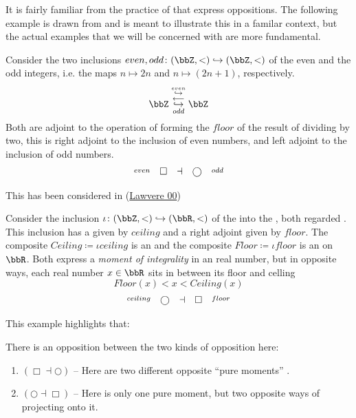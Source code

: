 It is fairly familiar from the practice of  that  express oppositions. The following example is drawn from  and is meant to illustrate this in a familar context, but the actual examples that we will be concerned with are more fundamental.
\begin{example}
\label{}\hypertarget{}{}
Consider the two inclusions $even, odd \colon (\bbZ,\lt ) \hookrightarrow (\bbZ,\lt)$ of the even and the odd integers, i.e. the maps $n \mapsto 2 n$ and $n \mapsto (2n+1)$, respectively.
\begin{displaymath}
\bbZ
\stackrel{\overset{even}{\hookrightarrow}}{\stackrel{\longleftarrow}{\underset{odd}{\hookrightarrow}}}
\bbZ
\end{displaymath}
Both are adjoint to the operation of forming the $floor$ of the result of dividing by two, this is right adjoint to the inclusion of even numbers, and left adjoint to the inclusion of odd numbers.
\begin{displaymath}
\begin{matrix}
\stackrel{even}{} & \Box &\dashv& \bigcirc & \stackrel{odd}{}
\end{matrix}
\end{displaymath}
\end{example}
This has been considered in (\href{http://ncatlab.org/nlab/show/Aufhebung#Law00}{Lawvere 00})
\begin{example}
\label{}\hypertarget{}{}
Consider the inclusion $\iota \colon (\bbZ, \lt) \hookrightarrow (\bbR, \lt)$ of the  into the , both regarded . This inclusion has a  given by $ceiling$ and a right adjoint given by $floor$. The composite $Ceiling \coloneqq \iota ceiling$ is an  and the composite $Floor \coloneqq \iota floor$ is an  on $\bbR$. Both express a \emph{moment of integrality} in an real number, but in opposite ways, each real number $x\in \bbR$ sits in between its floor and celling
\begin{displaymath}
Floor(x) \lt x \lt Ceiling(x)
\end{displaymath}
\begin{displaymath}
\begin{matrix}
\stackrel{ceiling}{} &\bigcirc &\dashv& \Box & \stackrel{floor}{}
\end{matrix}
\end{displaymath}
\end{example}
This example highlights that:
\begin{remark}
\label{TheTwoKindsOfOpposites}\hypertarget{TheTwoKindsOfOpposites}{}
There is an opposition between the two kinds of opposition here:
\begin{enumerate}%
\item $(\Box \dashv \bigcirc)$ -- Here are two different opposite ``pure moments'' .
\item $(\bigcirc \dashv \Box)$ -- Here is only one pure moment, but two opposite ways of projecting onto it.
\end{enumerate}
\end{remark}
